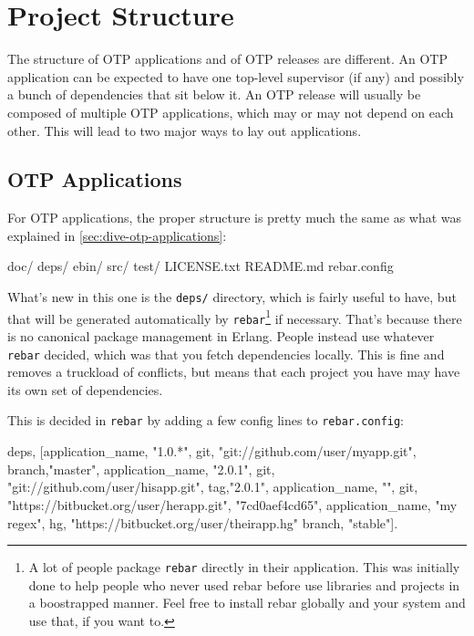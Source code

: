 \documentclass[11pt, oneside]{book}   	%
\newcommand{\filename}[1]{\Verb`#1`}
\newcommand{\app}[1]{\Verb`#1`}
\begin{document}
\section{Project Structure}
\label{sec:project-structure}

The structure of OTP applications and of OTP releases are different. An OTP application can be expected to have one top-level supervisor (if any) and possibly a bunch of dependencies that sit below it. An OTP release will usually be composed of multiple OTP applications, which may or may not depend on each other. This will lead to two major ways to lay out applications.

\subsection{OTP Applications}
\label{subsec:building-otp-applications}

For OTP applications, the proper structure is pretty much the same as what was explained in \ref{sec:dive-otp-applications}:

\begin{VerbatimText}
doc/
deps/
ebin/
src/
test/
LICENSE.txt
README.md
rebar.config
\end{VerbatimText}

What's new in this one is the \filename{deps/} directory, which is fairly useful to have, but that will be generated automatically by \app{rebar}\footnote{A lot of people package \app{rebar} directly in their application. This was initially done to help people who never used rebar before use libraries and projects in a boostrapped manner. Feel free to install rebar globally and your system and use that, if you want to.} if necessary. That's because there is no canonical package management in Erlang. People instead use whatever \app{rebar} decided, which was that you fetch dependencies locally. This is fine and removes a truckload of conflicts, but means that each project you have may have its own set of dependencies.

This is decided in \app{rebar} by adding a few config lines to \filename{rebar.config}:

\begin{VerbatimText}
{deps,
 [{application_name, "1.0.*",
   {git, "git://github.com/user/myapp.git", {branch,"master"}}},
  {application_name, "2.0.1",
   {git, "git://github.com/user/hisapp.git", {tag,"2.0.1"}}},
  {application_name, "", 
   {git, "https://bitbucket.org/user/herapp.git",  "7cd0aef4cd65"}},
  {application_name, "my regex",
   {hg, "https://bitbucket.org/user/theirapp.hg" {branch, "stable"}}}]}.
\end{VerbatimText}
\end{document}
